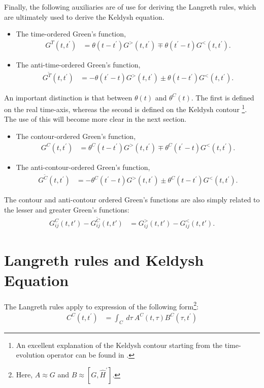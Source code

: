 Finally, the following auxiliaries are of use for deriving the Langreth rules, which are ultimately used to derive the Keldysh equation.
\begin{itemize}
\item The time-ordered Green's function, \begin{align*}
G^T(t,t^\prime) &= \theta(t-t^\prime) G^>(t,t^\prime)  \mp \theta(t^\prime-t)G^<(t,t^\prime) .
\end{align*}
\item The anti-time-ordered Green's function, \begin{align*}
G^{\tilde{T}}(t,t^\prime) &= - \theta(t^\prime-t) G^>(t,t^\prime)  \pm \theta(t-t^\prime)G^<(t,t^\prime) .
\end{align*} 
\end{itemize}

An important distinction is that between $\theta (t)$ and $\theta^C(t)$. The first is defined on the real time-axis, whereas the second is defined on the Keldysh contour \footnote{An excellent explanation of the Keldysh contour starting from the time-evolution operator can be found in \citet{diventra}.}. The use of this will become more clear in the next section. 
\begin{itemize}
\item The contour-ordered Green's function, \begin{align*}
G^C(t,t^\prime) &= \theta^C(t-t^\prime) G^>(t,t^\prime)  \mp \theta^C(t^\prime-t)G^<(t,t^\prime) .
\end{align*}
\item The anti-contour-ordered Green's function, \begin{align*}
G^{\tilde{C}}(t,t^\prime) &= - \theta^C(t^\prime-t) G^>(t,t^\prime)  \pm \theta^C(t-t^\prime)G^<(t,t^\prime).
\end{align*} 
\end{itemize}


The contour and anti-contour ordered Green's functions are also simply related to the lesser and greater Green's functions:
\begin{align*}
G^C_{ij}(t,t') - G^{\tilde{C}}_{ij}(t,t') &= G^>_{ij}(t,t') - G^<_{ij}(t,t').
\end{align*}

\section{Langreth rules and Keldysh Equation}
The Langreth rules apply to expression of the following form\footnote{Here, $A \approx G$ and $B \approx [G, \widehat{H}^\prime]$.}:
\begin{align*}
C^C(t,t^\prime) &= \int_C\:d\tau\:A^C(t,\tau) B^C (\tau, t^\prime)
\end{align*}

